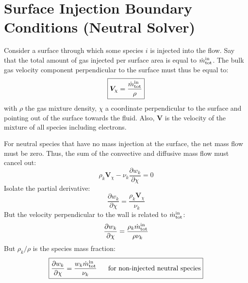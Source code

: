 \documentclass{warpdoc}
\newcommand\frameeqn[1]{\fbox{$\displaystyle #1$}}
\renewcommand{\vec}[1]{\bm{#1}}
\begin{document}
\section{Surface Injection Boundary Conditions (Neutral Solver)}

Consider a surface through which some species $i$ is injected into the flow. Say that the total amount of gas injected per surface area is equal to $\dot{m}^{\rm in}_{\rm tot}$. The bulk gas velocity component perpendicular to the surface must thus be equal to:
%
\begin{equation}
\frameeqn{
  \vec{V}_\chi = \frac{\dot{m}^{\rm in}_{\rm tot}}{\rho}
 }
\end{equation}
%
with $\rho$ the gas mixture density, $\chi$ a coordinate perpendicular to the surface and pointing out of the surface towards the fluid. Also, $\vec{V}$ is the  velocity of the mixture of all species including electrons.  

For neutral species that have no mass injection at the surface, the net mass flow must be zero. Thus, the sum of the convective and diffusive mass flow must cancel out:
%
\begin{equation}
  \rho_k \vec{V}_\chi - \nu_k \frac{\partial w_k}{\partial \chi} =0
\end{equation}
%
Isolate the partial derivative:
%
\begin{equation}
 \frac{\partial w_k}{\partial \chi}= \frac{\rho_k \vec{V}_\chi}{\nu_k} 
\end{equation}
%
But the velocity perpendicular to the wall is related to $\dot{m}^{\rm in}_{\rm tot}$:
%
\begin{equation}
 \frac{\partial w_k}{\partial \chi}= \frac{\rho_k \dot{m}^{\rm in}_{\rm tot}}{\rho \nu_k} 
\end{equation}
%
But $\rho_k/\rho$ is the species mass fraction:
%
\begin{equation}
\frameeqn{
 \frac{\partial w_k}{\partial \chi}= \frac{w_k \dot{m}^{\rm in}_{\rm tot}}{\nu_k} ~~~~~\textrm{for~non-injected~neutral~species}
}
\end{equation}
%
\end{document}
